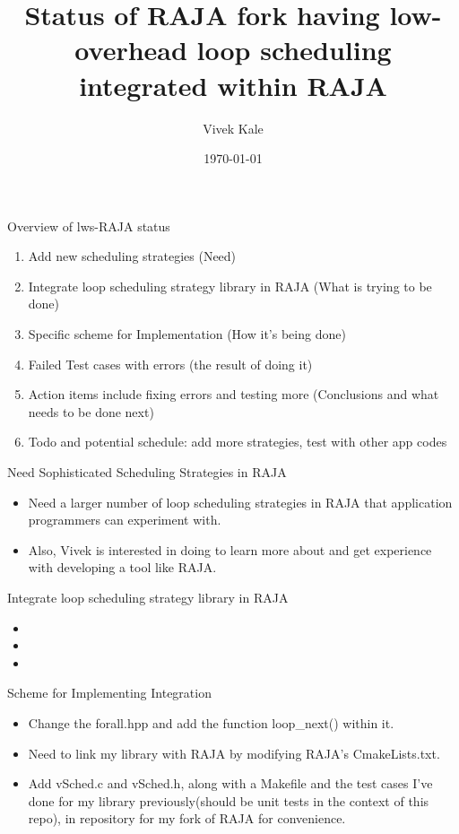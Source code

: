 \documentclass{beamer}
\title{Status of RAJA fork having low-overhead loop scheduling integrated within RAJA}
\author{Vivek Kale}
\date{\today}
\begin{document}
 

\begin{frame}[label=ovwlwsRAJAstatus]{Overview of lws-RAJA status}
\begin{enumerate} 
\item Add new scheduling strategies (Need)
\item Integrate loop scheduling strategy library in RAJA (What is trying to be done)
\item Specific scheme for Implementation (How it's being done)
\item Failed Test cases with errors (the result of doing it) 
\item Action items include fixing errors and testing more (Conclusions and what needs to be done next)
\item Todo and potential schedule: add more strategies, test with other app codes
\end{enumerate}
\end{frame}

\begin{frame}{Need Sophisticated Scheduling Strategies in RAJA}
\begin{itemize}
\item Need a larger number of loop scheduling strategies in RAJA that application programmers can experiment with.
\item Also, Vivek is interested in doing to learn more about and get experience with developing a tool like RAJA. 
\end{itemize} 
\end{frame}


\begin{frame}{Integrate loop scheduling strategy library in RAJA}
\begin{itemize}
\item 
\item 
\item
\end{itemize} 
\end{frame}

\begin{frame}{Scheme for Implementing Integration}
\begin{itemize}
\item Change the forall.hpp and add the function loop\_next() within it. 
\item Need to link my library with RAJA by modifying RAJA's CmakeLists.txt. 
\item Add vSched.c and vSched.h, along with a Makefile and the test cases I've done for my library previously(should be unit tests in the context of this repo), in repository for my fork of RAJA for convenience.
\end{itemize}

\end{frame}
\end{document}
